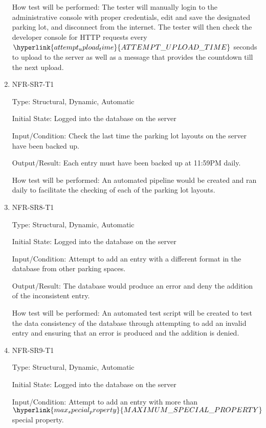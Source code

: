 \documentclass[12pt, titlepage]{article}
\begin{document}
\begin{enumerate}
How test will be performed: The tester will manually login to the administrative
console with proper credentials, edit and save the designated parking lot, and
disconnect from the internet. The tester will then check the developer console
for HTTP requests every $\hyperlink{attempt_upload_time}{ATTEMPT\_UPLOAD\_TIME}$
seconds to upload to the server as well as a message that provides the countdown
till the next upload.

\item{NFR-SR7-T1}

Type: Structural, Dynamic, Automatic
					
Initial State: Logged into the database on the server
					
Input/Condition: Check the last time the parking lot layouts on the server have
been backed up.
					
Output/Result: Each entry must have been backed up at 11:59PM daily.

How test will be performed: An automated pipeline would be created and ran daily
to facilitate the checking of each of the parking lot layouts.

\item{NFR-SR8-T1}

Type: Structural, Dynamic, Automatic
					
Initial State: Logged into the database on the server
					
Input/Condition: Attempt to add an entry with a different format in the database
from other parking spaces.
					
Output/Result: The database would produce an error and deny the addition of the
inconsistent entry.

How test will be performed: An automated test script will be created to test the
data consistency of the database through attempting to add an invalid entry and
ensuring that an error is produced and the addition is denied.

\item{NFR-SR9-T1}

Type: Structural, Dynamic, Automatic
					
Initial State: Logged into the database on the server
					
Input/Condition: Attempt to add an entry with more than \\
$\hyperlink{max_special_property}{MAXIMUM\_SPECIAL\_PROPERTY}$ special property.
					

\end{enumerate}
\end{document}

